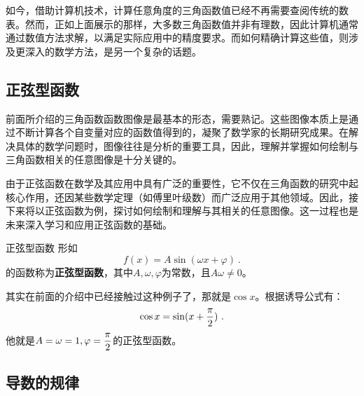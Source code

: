 如今，借助计算机技术，计算任意角度的三角函数值已经不再需要查阅传统的数表。然而，正如上面展示的那样，大多数三角函数值并非有理数，因此计算机通常通过数值方法求解，以满足实际应用中的精度要求。而如何精确计算这些值，则涉及更深入的数学方法，是另一个复杂的话题。

\subsection{正弦型函数}

前面所介绍的三角函数函数图像是最基本的形态，需要熟记。这些图像本质上是通过不断计算各个自变量对应的函数值得到的，凝聚了数学家的长期研究成果。在解决具体的数学问题时，图像往往是分析的重要工具，因此，理解并掌握如何绘制与三角函数相关的任意图像是十分关键的。

由于正弦函数在数学及其应用中具有广泛的重要性，它不仅在三角函数的研究中起核心作用，还因某些数学定理（如傅里叶级数）而广泛应用于其他领域。因此，接下来将以正弦函数为例，探讨如何绘制和理解与其相关的任意图像。这一过程也是未来深入学习和应用正弦函数的基础。

\begin{definition}{正弦型函数}
形如
\begin{equation}
f(x)=A\sin(\omega x+\varphi)~.
\end{equation}
的函数称为\textbf{正弦型函数}，其中$A,\omega,\varphi$为常数，且$A\omega\neq0$。
\end{definition}
其实在前面的介绍中已经接触过这种例子了，那就是$\cos x$。根据诱导公式有：
\begin{equation}
\cos x=\sin(x+{\pi\over2})~.
\end{equation}
他就是$\displaystyle A=\omega=1,\varphi={\pi\over2}$的正弦型函数。


\subsection{导数的规律}